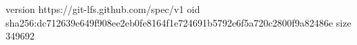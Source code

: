 version https://git-lfs.github.com/spec/v1
oid sha256:dc712639e649f908ee2eb0fe8164f1e724691b5792e6f5a720c2800f9a82486e
size 349692
